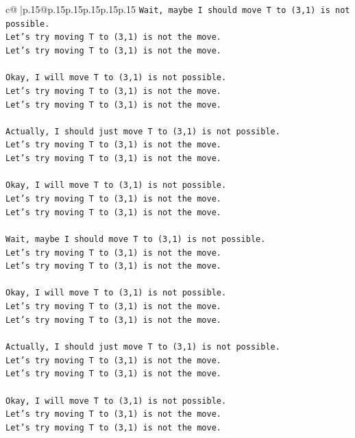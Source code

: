 \documentclass{article}
\begin{document}
{\begin{supertabular}{c@{$\;$}|p{.15\linewidth}@{}p{.15\linewidth}p{.15\linewidth}p{.15\linewidth}p{.15\linewidth}p{.15\linewidth}}
{{{\texttt{Wait, maybe I should move T to (3,1) is not possible.} \\
\texttt{Let's try moving T to (3,1) is not the move.} \\
\texttt{Let's try moving T to (3,1) is not the move.} \\
\\ 
\texttt{Okay, I will move T to (3,1) is not possible.} \\
\texttt{Let's try moving T to (3,1) is not the move.} \\
\texttt{Let's try moving T to (3,1) is not the move.} \\
\\ 
\texttt{Actually, I should just move T to (3,1) is not possible.} \\
\texttt{Let's try moving T to (3,1) is not the move.} \\
\texttt{Let's try moving T to (3,1) is not the move.} \\
\\ 
\texttt{Okay, I will move T to (3,1) is not possible.} \\
\texttt{Let's try moving T to (3,1) is not the move.} \\
\texttt{Let's try moving T to (3,1) is not the move.} \\
\\ 
\texttt{Wait, maybe I should move T to (3,1) is not possible.} \\
\texttt{Let's try moving T to (3,1) is not the move.} \\
\texttt{Let's try moving T to (3,1) is not the move.} \\
\\ 
\texttt{Okay, I will move T to (3,1) is not possible.} \\
\texttt{Let's try moving T to (3,1) is not the move.} \\
\texttt{Let's try moving T to (3,1) is not the move.} \\
\\ 
\texttt{Actually, I should just move T to (3,1) is not possible.} \\
\texttt{Let's try moving T to (3,1) is not the move.} \\
\texttt{Let's try moving T to (3,1) is not the move.} \\
\\ 
\texttt{Okay, I will move T to (3,1) is not possible.} \\
\texttt{Let's try moving T to (3,1) is not the move.} \\
\texttt{Let's try moving T to (3,1) is not the move.} \\
}}}
\end{supertabular}}
\end{document}
